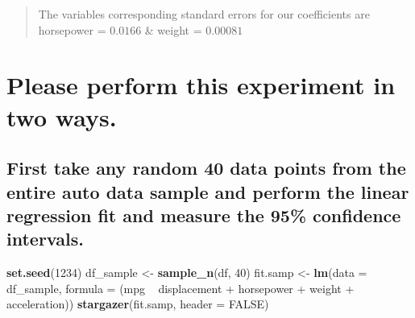 \documentclass[]{article}
\newenvironment{Shaded}{\begin{snugshade}}{\end{snugshade}}
\newcommand{\KeywordTok}[1]{\textcolor[rgb]{0.13,0.29,0.53}{\textbf{{#1}}}}
\newcommand{\DataTypeTok}[1]{\textcolor[rgb]{0.13,0.29,0.53}{{#1}}}
\newcommand{\DecValTok}[1]{\textcolor[rgb]{0.00,0.00,0.81}{{#1}}}
\newcommand{\StringTok}[1]{\textcolor[rgb]{0.31,0.60,0.02}{{#1}}}
\newcommand{\OtherTok}[1]{\textcolor[rgb]{0.56,0.35,0.01}{{#1}}}
\newcommand{\NormalTok}[1]{{#1}}
\begin{document}
\begin{quote}
The variables corresponding standard errors for our coefficients are
horsepower = \(0.0166\) \& weight = \(0.00081\)
\end{quote}

\newpage

\section{Please perform this experiment in two
ways.}\label{please-perform-this-experiment-in-two-ways.}

\subsection{First take any random 40 data points from the entire auto
data sample and perform the linear regression fit and measure the 95\%
confidence
intervals.}\label{first-take-any-random-40-data-points-from-the-entire-auto-data-sample-and-perform-the-linear-regression-fit-and-measure-the-95-confidence-intervals.}

\begin{Shaded}
\begin{Highlighting}[]
\KeywordTok{set.seed}\NormalTok{(}\DecValTok{1234}\NormalTok{)}
\NormalTok{df_sample <-}\StringTok{ }\KeywordTok{sample_n}\NormalTok{(df, }\DecValTok{40}\NormalTok{)}
\NormalTok{fit.samp <-}\StringTok{ }\KeywordTok{lm}\NormalTok{(}\DataTypeTok{data =} \NormalTok{df_sample, }\DataTypeTok{formula =} \NormalTok{(mpg ~}\StringTok{ }\NormalTok{displacement +}
\StringTok{                                              }\NormalTok{horsepower +}\StringTok{ }\NormalTok{weight +}\StringTok{ }\NormalTok{acceleration))}
\KeywordTok{stargazer}\NormalTok{(fit.samp, }\DataTypeTok{header =} \OtherTok{FALSE}\NormalTok{)}
\end{Highlighting}
\end{Shaded}
\end{document}
